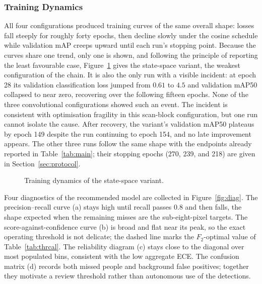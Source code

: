 \documentclass[12pt,a4paper,oneside]{report}
\begin{document}
\subsubsection{Training Dynamics}
All four configurations produced training curves of the same overall shape:
losses fall steeply for roughly forty epochs, then decline slowly under the
cosine schedule while validation mAP creeps upward until each run's stopping
point. Because the curves share one trend, only one is shown, and following
the principle of reporting the least favourable case, Figure~\ref{fig:training}
gives the state-space variant, the weakest configuration of the chain. It is
also the only run with a visible incident: at epoch 28 its validation
classification loss jumped from $0.61$ to $4.5$ and validation mAP50 collapsed
to near zero, recovering over the following fifteen epochs. None of the three
convolutional configurations showed such an event. The incident is consistent
with optimisation fragility in this scan-block configuration, but one run
cannot isolate the cause. After recovery, the variant's validation mAP50 plateaus by epoch
149 despite the run continuing to epoch 154, and no late improvement appears. The other three runs follow the same
shape with the endpoints already reported in Table~\ref{tab:main}; their
stopping epochs (270, 239, and 218) are given in Section~\ref{sec:protocol}.

\begin{figure}[tbp]
  \centering
  \caption{Training dynamics of the state-space variant.}
  \label{fig:training}
\end{figure}

Four diagnostics of the recommended model are collected in
Figure~\ref{fig:diag}. The precision--recall curve (a) stays high until
recall passes $0.8$ and then falls, the shape expected when the remaining
misses are the sub-eight-pixel targets. The score-against-confidence curve
(b) is broad and flat near its peak, so the exact operating threshold is not
delicate; the dashed line marks the $F_2$-optimal value of
Table~\ref{tab:thrcal}. The reliability diagram (c) stays close to the
diagonal over most populated bins, consistent with the low aggregate ECE.
The confusion matrix (d) records both missed people and background false
positives; together they motivate a review threshold rather than autonomous
use of the detections.
\end{document}
